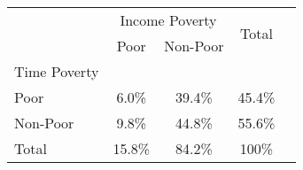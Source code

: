 \begin{table} 
  \centering
  \begin{tabular}{lcccc}
    \toprule
    & \multicolumn{2}{c}{Income Poverty} & \multirow{2}{*}{Total} \\
                   & Poor   & Non-Poor &        \\
    \midrule
    Time Poverty   &        &          &        \\
    \quad Poor     & 6.0\% & 39.4\%   & 45.4\%  \\
    \quad Non-Poor & 9.8\% & 44.8\%   & 55.6\% \\
    \cmidrule{1-4}
    Total          & 15.8\% & 84.2\%   & 100\%  \\
    \bottomrule
  \end{tabular}
\end{table}